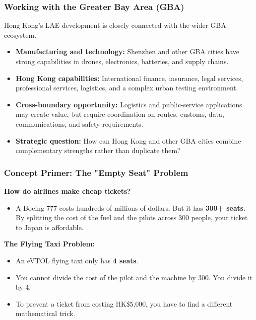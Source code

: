 \documentclass{beamer}
\begin{document}
\begin{frame}[t]
  \frametitle{Working with the Greater Bay Area (GBA)}
  Hong Kong's LAE development is closely connected with the wider GBA ecosystem.
  \begin{itemize}
    \item \textbf{Manufacturing and technology:} Shenzhen and other GBA cities have strong capabilities in drones, electronics, batteries, and supply chains.
    \item \textbf{Hong Kong capabilities:} International finance, insurance, legal services, professional services, logistics, and a complex urban testing environment.
    \item \textbf{Cross-boundary opportunity:} Logistics and public-service applications may create value, but require coordination on routes, customs, data, communications, and safety requirements.
    \item \textbf{Strategic question:} How can Hong Kong and other GBA cities combine complementary strengths rather than duplicate them?
  \end{itemize}
\end{frame}

\begin{frame}[t]
  \frametitle{Concept Primer: The "Empty Seat" Problem}
  
  \textbf{How do airlines make cheap tickets?}
  \begin{itemize}
      \item A Boeing 777 costs hundreds of millions of dollars. But it has \textbf{300+ seats}. By splitting the cost of the fuel and the pilots across 300 people, your ticket to Japan is affordable.
  \end{itemize}

  \vspace{0.3cm}
  \textbf{The Flying Taxi Problem:}
  \begin{itemize}
      \item An eVTOL flying taxi only has \textbf{4 seats}.
      \item You cannot divide the cost of the pilot and the machine by 300. You divide it by 4. 
      \item To prevent a ticket from costing HK\$5,000, you have to find a different mathematical trick.
  \end{itemize}
\end{frame}
\end{document}
